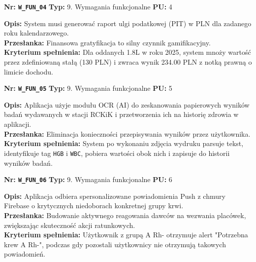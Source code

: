 \documentclass[11pt, a4paper]{article}
\newcommand{\req}[1]{\texttt{#1}}
\begin{document}
\begin{mdframed}[style=reqheader]
  \textbf{Nr: \req{W\_FUN\_04}} \hfill \textbf{Typ:} 9. Wymagania funkcjonalne \hfill \textbf{PU:} 4
\end{mdframed}
\begin{mdframed}[style=reqcard]
  \textbf{Opis:} System musi generować raport ulgi podatkowej (PIT) w PLN dla zadanego roku kalendarzowego. \\
  \textbf{Przesłanka:} Finansowa gratyfikacja to silny czynnik gamifikacyjny. \\
  \textbf{Kryterium spełnienia:} Dla oddanych 1.8L w roku 2025, system mnoży wartość przez zdefiniowaną stałą (130 PLN) i zwraca wynik 234.00 PLN z notką prawną o limicie dochodu.
\end{mdframed}

\begin{mdframed}[style=reqheader]
  \textbf{Nr: \req{W\_FUN\_05}} \hfill \textbf{Typ:} 9. Wymagania funkcjonalne \hfill \textbf{PU:} 5
\end{mdframed}
\begin{mdframed}[style=reqcard]
  \textbf{Opis:} Aplikacja użyje modułu OCR (AI) do zeskanowania papierowych wyników badań wydawanych w stacji RCKiK i przetworzenia ich na historię zdrowia w aplikacji. \\
  \textbf{Przesłanka:} Eliminacja konieczności przepisywania wyników przez użytkownika. \\
  \textbf{Kryterium spełnienia:} System po wykonaniu zdjęcia wydruku parsuje tekst, identyfikuje tag \texttt{HGB} i \texttt{WBC}, pobiera wartości obok nich i zapisuje do historii wyników badań.
\end{mdframed}

\begin{mdframed}[style=reqheader]
  \textbf{Nr: \req{W\_FUN\_06}} \hfill \textbf{Typ:} 9. Wymagania funkcjonalne \hfill \textbf{PU:} 6
\end{mdframed}
\begin{mdframed}[style=reqcard]
  \textbf{Opis:} Aplikacja odbiera spersonalizowane powiadomienia Push z chmury Firebase o krytycznych niedoborach konkretnej grupy krwi. \\
  \textbf{Przesłanka:} Budowanie aktywnego reagowania dawców na wezwania placówek, zwiększając skuteczność akcji ratunkowych. \\
  \textbf{Kryterium spełnienia:} Użytkownik z grupą A Rh- otrzymuje alert "Potrzebna krew A Rh-", podczas gdy pozostali użytkownicy nie otrzymują takowych powiadomień.
\end{mdframed}
\end{document}
